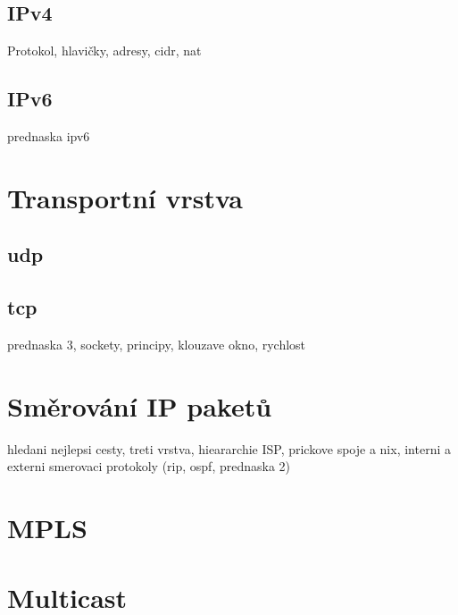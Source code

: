 \subsection{IPv4}
Protokol, hlavičky, adresy, cidr, nat

\subsection{IPv6}
prednaska ipv6


\section{Transportní vrstva}

\subsection{udp}

\subsection{tcp}
prednaska 3, sockety, principy, klouzave okno, rychlost


\section{Směrování IP paketů}
hledani nejlepsi cesty, treti vrstva, hieararchie ISP, prickove spoje a nix, interni a externi smerovaci protokoly (rip, ospf, prednaska 2)

\section{MPLS}

\section{Multicast}

















